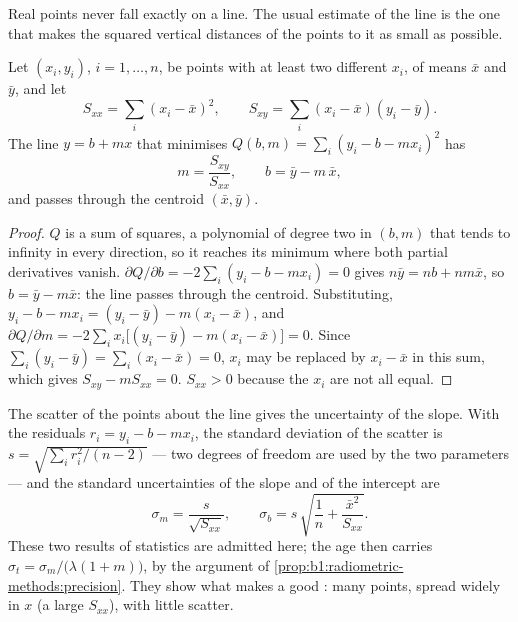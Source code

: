 Real points never fall exactly on a line. The usual estimate of the line is the
one that makes the squared vertical distances of the points to it as small as
possible.

\begin{proposition}\label{prop:b1:radiometric-methods:lsq}
Let $(x_i, y_i)$, $i = 1, \dots, n$, be points with at least two different $x_i$,
of means $\bar x$ and $\bar y$, and let
\[
  S_{xx} = \sum_i (x_i - \bar x)^2, \qquad S_{xy} = \sum_i (x_i - \bar x)(y_i - \bar y).
\]
The line $y = b + m x$ that minimises $Q(b, m) = \sum_i (y_i - b - m x_i)^2$ has
\[
  m = \frac{S_{xy}}{S_{xx}}, \qquad b = \bar y - m\,\bar x ,
\]
and passes through the centroid $(\bar x, \bar y)$.
\end{proposition}

\begin{proof}
$Q$ is a sum of squares, a polynomial of degree two in $(b, m)$ that tends to
infinity in every direction, so it reaches its minimum where both partial
derivatives vanish. $\partial Q/\partial b = -2 \sum_i (y_i - b - m x_i) = 0$
gives $n\bar y = n b + n m \bar x$, so $b = \bar y - m \bar x$: the line passes
through the centroid. Substituting, $y_i - b - m x_i = (y_i - \bar y) - m(x_i -
\bar x)$, and $\partial Q/\partial m = -2 \sum_i x_i \bigl[(y_i - \bar y) - m(x_i
- \bar x)\bigr] = 0$. Since $\sum_i (y_i - \bar y) = \sum_i (x_i - \bar x) = 0$, $x_i$
may be replaced by $x_i - \bar x$ in this sum, which gives $S_{xy} - m S_{xx} = 0$.
$S_{xx} > 0$ because the $x_i$ are not all equal.
\end{proof}

The scatter of the points about the line gives the uncertainty of the slope.
With the residuals $r_i = y_i - b - m x_i$, the standard deviation of the
scatter is $s = \sqrt{\sum_i r_i^2/(n-2)}$ --- two degrees of freedom are used
by the two parameters --- and the standard uncertainties of the slope and of the
intercept are
\[
  \sigma_m = \frac{s}{\sqrt{S_{xx}}}, \qquad
  \sigma_b = s\,\sqrt{\frac1n + \frac{\bar x^2}{S_{xx}}} .
\]
These two results of statistics are admitted here; the age then carries
$\sigma_t = \sigma_m/\bigl(\lambda(1 + m)\bigr)$, by the argument of
\cref{prop:b1:radiometric-methods:precision}. They show what makes a good
: many points, spread widely in $x$ (a large $S_{xx}$), with little
scatter.

